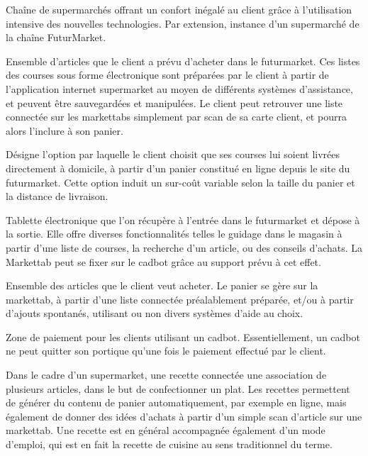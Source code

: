 Chaîne de supermarchés offrant un confort inégalé au client grâce à l'utilisation intensive des nouvelles technologies.
Par extension, instance d'un supermarché de la chaîne FuturMarket.
\par

Ensemble d'articles que le client a prévu d'acheter dans le futurmarket.
Ces listes des courses sous forme électronique sont préparées par le client à partir de l'application internet supermarket au moyen de différents systèmes d'assistance, et peuvent être sauvegardées et manipulées. 
Le client peut retrouver une liste connectée sur les markettabs simplement par scan de sa carte client, et pourra alors l'inclure à son panier.
\par

Désigne l'option par laquelle le client choisit que ses courses lui soient livrées directement à domicile, à partir d'un panier constitué en ligne depuis le site du futurmarket.
Cette option induit un sur-coût variable selon la taille du panier et la distance de livraison.
\par

Tablette électronique que l'on récupère à l'entrée dans le futurmarket et dépose à la sortie.
Elle offre diverses fonctionnalités telles le guidage dans le magasin à partir d'une liste de courses, la recherche d'un article, ou des conseils d'achats.
La Markettab peut se fixer sur le cadbot grâce au support prévu à cet effet.
\par

Ensemble des articles que le client veut acheter.
Le panier se gère sur la markettab, à partir d'une liste connectée préalablement préparée, et/ou à partir d'ajouts spontanés, utilisant ou non divers systèmes d'aide au choix.
\par

Zone de paiement pour les clients utilisant un cadbot.
Essentiellement, un cadbot ne peut quitter son portique qu'une fois le paiement effectué par le client.
\par

Dans le cadre d'un supermarket, une recette connectée une association de plusieurs articles, dans le but de confectionner un plat. 
Les recettes permettent de générer du contenu de panier automatiquement, par exemple en ligne, mais également de donner des idées d'achats à partir d'un simple scan d'article sur une markettab.
Une recette est en général accompagnée également d'un mode d'emploi, qui est en fait la recette de cuisine au sens traditionnel du terme.
\par 

